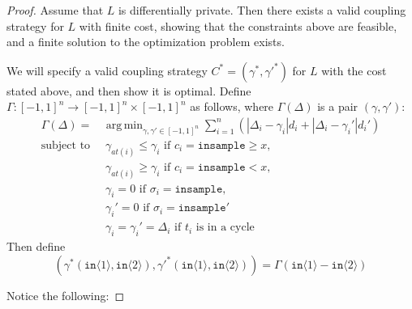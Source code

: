 \documentclass[12pt]{article}
\newcommand{\gguard}[1][x]{\texttt{insample}\geq#1}
\newcommand{\lguard}[1][x]{\texttt{insample} < #1}
\newcommand{\brangle}[1]{\langle#1 \rangle}
\DeclareMathOperator*{\argmin}{arg\,min}
\theoremstyle{definition}
\begin{document}
\begin{proof}
    Assume that $L$ is differentially private. Then there exists a valid coupling strategy for $L$ with finite cost, showing that the constraints above are feasible, and a finite solution to the optimization problem exists.  

    We will specify a valid coupling strategy $C^* = (\gamma^*, {\gamma'}^*)$ for $L$ with the cost stated above, and then show it is optimal. Define $\Gamma: [-1, 1]^n \to [-1, 1]^n \times [-1, 1]^n$ as follows, where $\Gamma(\Delta)$ is a pair $(\gamma, \gamma')$: 
    \begin{align*}
        \Gamma(\Delta) = &\argmin_{\gamma, \gamma' \in [-1, 1]^n} \sum_{i = 1}^n \left(|\Delta_i - \gamma_i| d_i + |\Delta_i - \gamma_i'|d_i' \right)\\ 
        \text{subject to }
        &\ \gamma_{at(i)} \leq \gamma_i \text{ if } c_i = \gguard, \\
        &\ \gamma_{at(i)} \geq \gamma_i \text{ if } c_i = \lguard, \\
        &\ \gamma_i = 0 \text{ if } \sigma_i = \texttt{insample}, \\
        &\ \gamma_i' = 0 \text{ if } \sigma_i = \texttt{insample}'\\
        &\ \gamma_i = \gamma_i'= \Delta_i \text{ if } t_i \text{ is in a cycle}
    \end{align*}
    Then define \[(\gamma^*(\texttt{in}\brangle{1}, \texttt{in}\brangle{2}), {\gamma'}^*(\texttt{in}\brangle{1}, \texttt{in}\brangle{2})) = \Gamma(\texttt{in}\brangle{1} - \texttt{in}\brangle{2})\]

    Notice the following: 


\end{proof}
\end{document}
